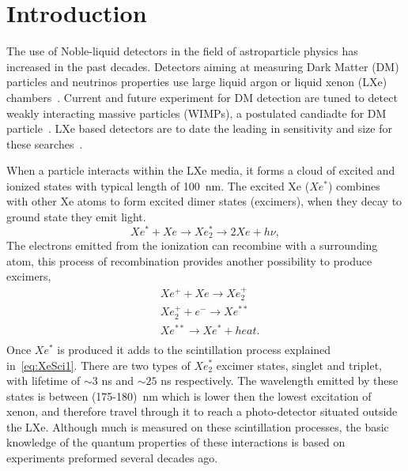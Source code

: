 \section{Introduction}
\label{sec:Intro}

The use of Noble-liquid detectors in the field of astroparticle physics has increased in the past decades. 
Detectors aiming at measuring Dark Matter (DM) particles and neutrinos properties use large liquid argon or 
liquid xenon (LXe) chambers~\cite{Aprile:2009dv,Rubbia:2013tpa}. Current and future experiment for DM detection 
are tuned to detect weakly interacting massive particles (WIMPs), a postulated candiadte for DM particle~\cite{Bertone:2010zza}. 
LXe based detectors are to date the leading in sensitivity and size for these searches~\cite{Aprile:2017iyp,Akerib:2016vxi,Fu:2016ega,Aalbers:2016jon}. 

When a particle interacts within the LXe media, it forms a cloud of excited and ionized states with typical length of 100~nm. 
The excited Xe ($Xe^*$) combines with other Xe atoms to form excited dimer states (excimers), when they decay to ground state they emit light. 
\begin{equation} \label{eq:XeSci1}
 Xe^*+Xe \rightarrow Xe^*_2 \rightarrow 2Xe + h \nu , 
\end{equation}
The electrons emitted from the ionization can recombine with a surrounding atom, this process of recombination provides another possibility to produce excimers,
\begin{equation} \label{eq:XeSci2}
\begin{split}
  &Xe^{+} + Xe \rightarrow Xe^{+}_2 \\
  &Xe^{+}_2 + e^{-}  \rightarrow Xe^{**} \\
  &Xe^{**}   \rightarrow Xe^* + heat .\\
  \end{split}
\end{equation}  
Once $Xe^*$ is produced it adds to the scintillation process explained in~\ref{eq:XeSci1}. There are two types of $Xe^*_2$ excimer states, 
singlet and triplet, with lifetime of $\sim3$ ns and $\sim25$ ns respectively. The wavelength emitted by these states is between (175-180)~nm 
which is lower then the lowest excitation of xenon, and therefore travel through it to reach a photo-detector situated outside the LXe. Although 
much is measured on these scintillation processes, the basic knowledge of the quantum properties of these interactions is based on experiments 
preformed several decades ago.

